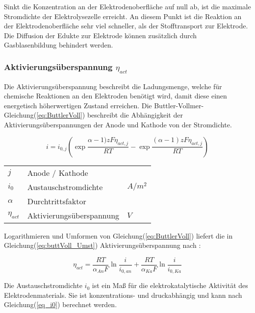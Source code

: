 \documentclass[onecolumn,10pt,titlepage]{article}
\begin{document}
	
	Sinkt die Konzentration an der Elektrodenoberfläche auf null ab, ist die maximale Stromdichte der Elektrolysezelle erreicht. An diesem Punkt ist die Reaktion an der Elektrodenoberfläche sehr viel schneller, als der Stofftransport zur Elektrode.\cite{UniversitatUlm.2016} Die Diffusion der Edukte zur Elektrode können zusätzlich durch Gasblasenbildung behindert werden.
	
	\subsubsection*{Aktivierungsüberspannung $\eta_{act}$}
	Die Aktivierungsüberspannung beschreibt die Ladungsmenge, welche für chemische Reaktionen an den Elektroden benötigt wird, damit diese einen energetisch höherwertigen Zustand erreichen.\cite{Klein.2013} Die Buttler-Vollmer-Gleichung(\ref{eq:ButtlerVoll}) \cite{NI.2007} beschreibt die Abhängigkeit der Aktivierungsüberspannungen der Anode und Kathode von der Stromdichte.
	
	\begin{equation}
		i=i_{0,j}\left(\exp{\frac{\alpha -1)zF\eta_{act,j}}{RT}-\exp{\frac{(\alpha -1)zF\eta_{act,j}}{RT}}}\right)
		\label{eq:ButtlerVoll}
	\end{equation}
			
			
			\begin{table}[H]
				\begin{tabular*}{\textwidth}{lll}
					$j$&Anode / Kathode&\\
					$i_0$&Austauschstromdichte&$A/m^2$\\
					$\alpha$&Durchtrittsfaktor&\\
					$\eta_{act}$&Aktivierungsüberspannung&$V$\\
				\end{tabular*}
			\end{table}
			
			Logarithmieren und Umformen von Gleichung(\ref{eq:ButtlerVoll}) liefert die in Gleichung(\ref{eq:buttVoll_Umst}) Aktivierungsüberspannung nach :
			
			\begin{equation}
				\eta_{act}=\frac{RT}{\alpha_{An}F}\ln{\frac{i}{i_{0,an}}}+\frac{RT}{\alpha_{Ka}F}\ln{\frac{i}{i_{0,Ka}}}
				\label{eq:buttVoll_Umst}
			\end{equation}
			
			
			Die Austauschstromdichte $i_0$ ist ein Maß für die elektrokatalytische Aktivität des Elektrodenmaterials. Sie ist konzentrations- und druckabhängig und kann nach Gleichung(\ref{eq_i0}) berechnet werden.\cite{NI.2007} 
			
\end{document}
